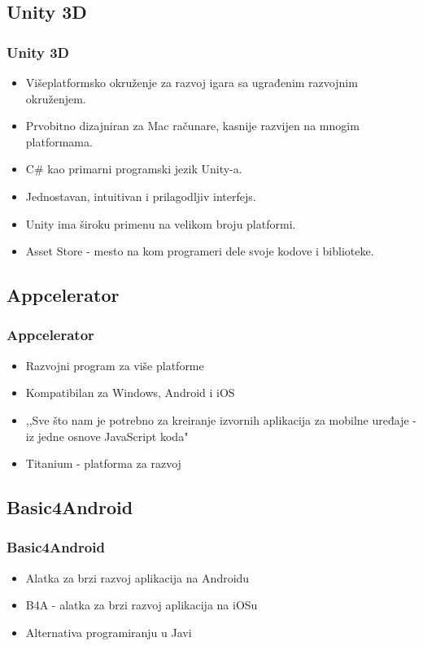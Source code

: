 \documentclass{beamer}
\begin{document}
\begin{frame}
    \section{Unity 3D}
    \frametitle{Unity 3D} 
    \begin{itemize}
	\item Višeplatformsko okruženje za razvoj igara sa ugrađenim razvojnim okruženjem. 
        \item Prvobitno dizajniran za Mac računare, kasnije razvijen na mnogim platformama. 
	\item C# kao primarni programski jezik Unity-a.
	\item Jednostavan, intuitivan i prilagodljiv interfejs.
        \item Unity ima široku primenu na velikom broju platformi.
	\item Asset Store - mesto na kom programeri dele svoje kodove i biblioteke. 
   \end{itemize}
\end{frame}

\begin{frame}
    \section{Appcelerator}
    \frametitle{Appcelerator} 
    \begin{itemize}
    	\item Razvojni program za više platforme
	\item Kompatibilan za Windows, Android i iOS
	\item ,,Sve što nam je potrebno za kreiranje izvornih aplikacija za mobilne uređaje - iz jedne osnove JavaScript koda"
	\item  Titanium - platforma za razvoj
   \end{itemize}
\end{frame}

\begin{frame}
    \section{Basic4Android}
    \frametitle{Basic4Android} 
    \begin{itemize}
	\item Alatka za brzi razvoj aplikacija na Androidu
	\item B4A - alatka za brzi razvoj aplikacija na iOSu
	\item Alternativa programiranju u Javi
   \end{itemize}
\end{frame}
\end{document}

